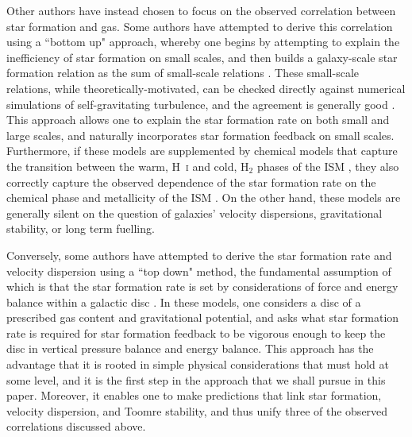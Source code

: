 \documentclass[useAMS,usenatbib]{mn2e}
\begin{document}
Other authors have instead chosen to focus on the observed correlation between star formation and gas. Some authors have attempted to derive this correlation using a ``bottom up" approach, whereby one begins by attempting to explain the inefficiency of star formation on small scales, and then builds a galaxy-scale star formation relation as the sum of small-scale relations \citep{krumholz05c, krumholz09b, padoan12a, federrath12a, federrath13a, krumholz13c, federrath15b, burkhart18a}. These small-scale relations, while theoretically-motivated, can be checked directly against numerical simulations of self-gravitating turbulence, and the agreement is generally good \citep[e.g.,][]{padoan11a, federrath12a, padoan14a}. This approach allows one to explain the star formation rate on both small and large scales, and naturally incorporates star formation feedback on small scales. Furthermore, if these models are supplemented by chemical models that capture the transition between the warm, H~\textsc{i} and cold, H$_2$ phases of the ISM \citep{krumholz09b, krumholz13c}, they also correctly capture the observed dependence of the star formation rate on the chemical phase and metallicity of the ISM \citep{bolatto11a, wong13a, shi14a, filho16a, jameson16a, rafelski16a}. On the other hand, these models are generally silent on the question of galaxies' velocity dispersions, gravitational stability, or long term fuelling.

Conversely, some authors have attempted to derive the star formation rate and velocity dispersion using a ``top down" method, the fundamental assumption of which is that the star formation rate is set by considerations of force and energy balance within a galactic disc \citep[e.g.,][]{thompson05a, ostriker10a, ostriker11a, hopkins11a, faucher-giguere13a, hayward17a}. In these models, one considers a disc of a prescribed gas content and gravitational potential, and asks what star formation rate is required for star formation feedback to be vigorous enough to keep the disc in vertical pressure balance and energy balance. This approach has the advantage that it is rooted in simple physical considerations that must hold at some level, and it is the first step in the approach that we shall pursue in this paper. Moreover, it enables one to make predictions that link star formation, velocity dispersion, and Toomre stability, and thus unify three of the observed correlations discussed above. 
\end{document}
